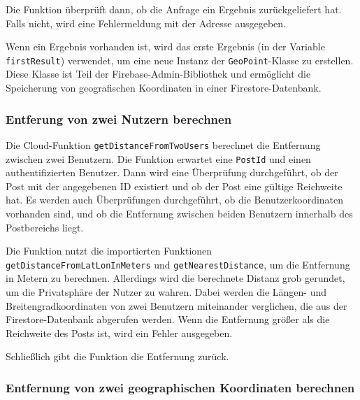 Die Funktion überprüft dann, ob die Anfrage ein Ergebnis zurückgeliefert hat. Falls nicht, wird eine Fehlermeldung mit der Adresse ausgegeben.

Wenn ein Ergebnis vorhanden ist, wird das erste Ergebnis (in der Variable \texttt{firstResult}) verwendet, um eine neue Instanz der \texttt{GeoPoint}-Klasse zu erstellen. Diese Klasse ist Teil der Firebase-Admin-Bibliothek und ermöglicht die Speicherung von geografischen Koordinaten in einer Firestore-Datenbank.

\subsubsection{Entferung von zwei Nutzern berechnen}
Die Cloud-Funktion \texttt{getDistanceFromTwoUsers} berechnet die Entfernung zwischen zwei Benutzern. Die Funktion erwartet eine \texttt{PostId} und einen authentifizierten Benutzer. Dann wird eine Überprüfung durchgeführt, ob der Post mit der angegebenen ID existiert und ob der Post eine gültige Reichweite hat. Es werden auch Überprüfungen durchgeführt, ob die Benutzerkoordinaten vorhanden sind, und ob die Entfernung zwischen beiden Benutzern innerhalb des Postbereichs liegt.

Die Funktion nutzt die importierten Funktionen \texttt{getDistanceFromLatLonInMeters} und \texttt{getNearestDistance}, um die Entfernung in Metern zu berechnen. Allerdings wird die berechnete Distanz grob gerundet, um die Privatsphäre der Nutzer zu wahren. Dabei werden die Längen- und Breitengradkoordinaten von zwei Benutzern miteinander verglichen, die aus der Firestore-Datenbank abgerufen werden. Wenn die Entfernung größer als die Reichweite des Posts ist, wird ein Fehler ausgegeben.

Schließlich gibt die Funktion die Entfernung zurück.

\subsubsection{Entfernung von zwei geographischen Koordinaten berechnen}

